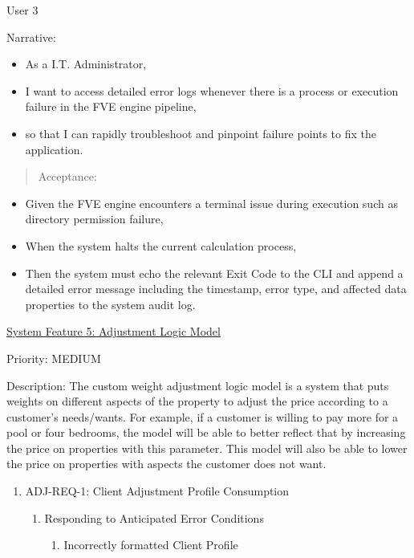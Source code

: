 User 3

Narrative:

\begin{itemize}
\item
  As a I.T. Administrator,
\item
  I want to access detailed error logs whenever there is a process or
  execution failure in the FVE engine pipeline,
\item
  so that I can rapidly troubleshoot and pinpoint failure points to fix
  the application.
\end{itemize}

\begin{quote}
Acceptance:
\end{quote}

\begin{itemize}
\item
  Given the FVE engine encounters a terminal issue during execution such
  as directory permission failure,
\item
  When the system halts the current calculation process,
\item
  Then the system must echo the relevant Exit Code to the CLI and append
  a detailed error message including the timestamp, error type, and
  affected data properties to the system audit log.
\end{itemize}

\ul{System Feature 5: Adjustment Logic Model}

Priority: MEDIUM

Description: The custom weight adjustment logic model is a system that
puts weights on different aspects of the property to adjust the price
according to a customer's needs/wants. For example, if a customer is
willing to pay more for a pool or four bedrooms, the model will be able
to better reflect that by increasing the price on properties with this
parameter. This model will also be able to lower the price on properties
with aspects the customer does not want.

\begin{enumerate}
\def\labelenumi{\Roman{enumi})}
\item
  ADJ-REQ-1: Client Adjustment Profile Consumption

  \begin{enumerate}
  \def\labelenumii{\alph{enumii}.}
  \item
    Responding to Anticipated Error Conditions

    \begin{enumerate}
    \def\labelenumiii{\roman{enumiii}.}
    \item
      Incorrectly formatted Client Profile
    \end{enumerate}
  \end{enumerate}
\end{enumerate}

